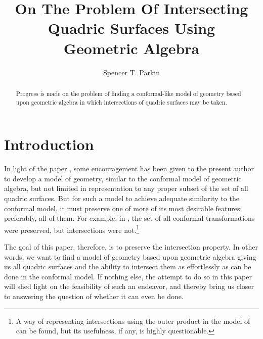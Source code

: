 \documentclass{birkjour}
\theoremstyle{definition}
\theoremstyle{remark}
\numberwithin{equation}{section}
\begin{document}
\title{On The Problem Of Intersecting\\Quadric Surfaces Using\\Geometric Algebra}

\author{Spencer T. Parkin}
\address{102 W. 500 S., \\
Salt Lake City, UT  84101} 



\begin{abstract}
Progress is made on the problem of finding a conformal-like model of geometry
based upon geometric algebra in which intersections of quadric surfaces
may be taken.
\end{abstract}


\maketitle

\section{Introduction}

In light of the paper \cite{}, some encouragement has been given to the present
author to develop a model of geometry, similar to the conformal model of geometric
algebra, but not limited in representation to any proper subset of the set of all
quadric surfaces.  But for such a model to achieve adequate similarity to the conformal model,
it must preserve one of more of its most desirable features; preferably, all of them.
For example, in \cite{}, the set of all conformal transformations were preserved, but
intersections were not.\footnote{A way of representing intersections using the outer
product in the model of \cite{} can be found, but its usefulness, if any, is highly questionable.}

The goal of this paper, therefore, is to
preserve the intersection property.  In other words, we want to find a model of geometry based upon
geometric algebra giving us all quadric surfaces and the ability to intersect them
as effortlessly as can be done in the conformal model.  If nothing else, the attempt
to do so in this paper will shed light on the feasibility of such an endeavor, and thereby
bring us closer to answering the question of whether it can even be done.
\end{document}
